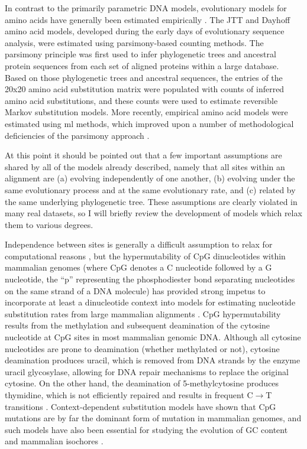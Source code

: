 In contrast to the primarily parametric DNA models, evolutionary
models for amino acids have generally been estimated empirically
\citep{Whelan2001}. The JTT \citep{Jones1992} and Dayhoff
\citep{Dayhoff1978} amino acid models, developed during the early days
of evolutionary sequence analysis, were estimated using
parsimony-based counting methods. The parsimony principle was first
used to infer phylogenetic trees and ancestral protein sequences from
each set of aligned proteins within a large database. Based on those
phylogenetic trees and ancestral sequences, the entries of the 20x20
amino acid substitution matrix were populated with counts of inferred
amino acid substitutions, and these counts were used to estimate
reversible Markov substitution models. More recently, empirical amino
acid models were estimated using \ac{ml} methods, which improved upon
a number of methodological deficiencies of the parsimony approach
\citep{Adachi1996,Whelan2001b}.

At this point it should be pointed out that a few important
assumptions are shared by all of the models already described, namely
that all sites within an alignment are (a) evolving independently of
one another, (b) evolving under the same evolutionary process and at
the same evolutionary rate, and (c) related by the same underlying
phylogenetic tree. These assumptions are clearly violated in many real
datasets, so I will briefly review the development of models which
relax them to various degrees.

Independence between sites is generally a difficult assumption to
relax for computational reasons \citep{Kosiol2006c}, but the
hypermutability of CpG dinucleotides within mammalian genomes (where
CpG denotes a C nucleotide followed by a G nucleotide, the ``p''
representing the phosphodiester bond separating nucleotides on the
same strand of a DNA molecule) has provided strong impetus to
incorporate at least a dinucleotide context into models for estimating
nucleotide substitution rates from large mammalian alignments
\citep{Blake1992,Hwang2004a,Siepel2004a}. CpG hypermutability results
from the methylation and subsequent deamination of the cytosine
nucleotide at CpG sites in most mammalian genomic DNA. Although all
cytosine nucleotides are prone to deamination (whether methylated or
not), cytosine deamination produces uracil, which is removed from DNA
strands by the enzyme uracil glycosylase, allowing for DNA repair
mechanisms to replace the original cytosine. On the other hand, the
deamination of 5-methylcytosine produces thymidine, which is not
efficiently repaired and results in frequent C$\to$T transitions
\citep{Ehrlich1982,Hwang2004a}. Context-dependent substitution models
have shown that CpG mutations are by far the dominant form of mutation
in mammalian genomes, and such models have also been essential for
studying the evolution of GC content and mammalian isochores
\citep{Duret2006,Duret2008}.

